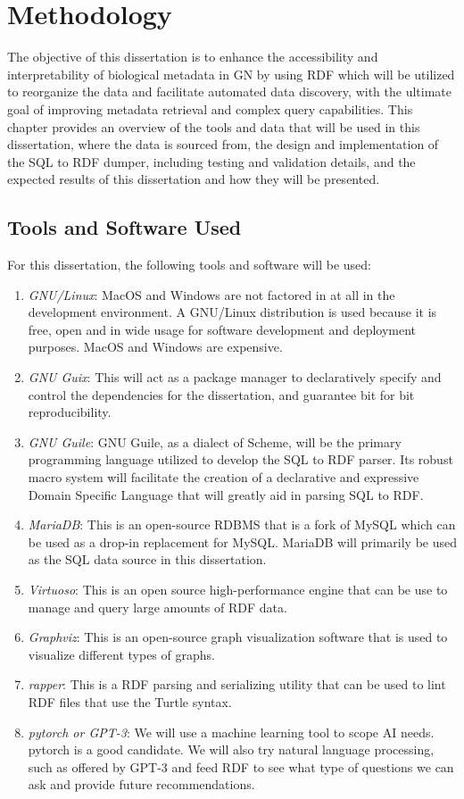 \chapter{Methodology}

The objective of this dissertation is to enhance the accessibility and interpretability of biological metadata in GN by using RDF which will be utilized to reorganize the data and facilitate automated data discovery, with the ultimate goal of improving metadata retrieval and complex query capabilities.  This chapter provides an overview of the tools and data that will be used in this dissertation, where the data is sourced from, the design and implementation of the SQL to RDF dumper, including testing and validation details, and the expected results of this dissertation and how they will be presented.

\section{Tools and Software Used}

For this dissertation, the following tools and software will be used:

\begin{enumerate}
\item \textit{GNU/Linux}:  MacOS and Windows are not factored in at all in the development environment.  A GNU/Linux distribution is used because it is free, open and in wide usage for software development and deployment purposes.  MacOS and Windows are expensive.
\item \textit{GNU Guix}: This will act as a package manager to declaratively specify and control the dependencies for the dissertation, and guarantee bit for bit reproducibility.
\item \textit{GNU Guile}: GNU Guile, as a dialect of Scheme, will be the primary programming language utilized to develop the SQL to RDF parser. Its robust macro system will facilitate the creation of a declarative and expressive Domain Specific Language that will greatly aid in parsing SQL to RDF.
\item \textit{MariaDB}: This is an open-source RDBMS that is a fork of MySQL which can be used as a drop-in replacement for MySQL.  MariaDB will primarily be used as the SQL data source in this dissertation.
\item \textit{Virtuoso}: This is an open source high-performance engine that can be use to manage and query large amounts of RDF data.
\item \textit{Graphviz}: This is an open-source graph visualization software that is used to visualize different types of graphs.
\item \textit{rapper}: This is a RDF parsing and serializing utility that can be used to lint RDF files that use the Turtle syntax.
\item \textit{pytorch or GPT-3}: We will use a machine learning tool to scope AI needs. pytorch is a good candidate.  We will also try natural language processing, such as offered by GPT-3 and feed RDF to see what type of questions we can ask and provide future recommendations.
\end{enumerate}

